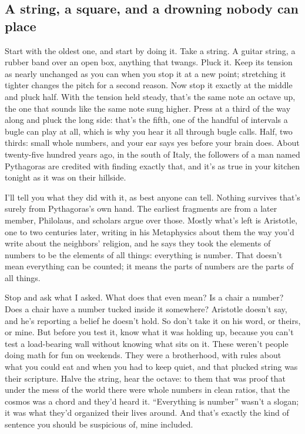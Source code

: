 \documentclass[11pt,twoside]{article}
\theoremstyle{thielethm}
\theoremstyle{thieledef}
\theoremstyle{thieledef}
\theoremstyle{thieledef}
\theoremstyle{thielethm}
\theoremstyle{thieleobs}
\theoremstyle{thielethm}
\begin{document}
\subsection{A string, a square, and a drowning nobody can place}

Start with the oldest one, and start by doing it. Take a string. A guitar string, a rubber band over an open box, anything that twangs. Pluck it. Keep its tension as nearly unchanged as you can when you stop it at a new point; stretching it tighter changes the pitch for a second reason. Now stop it exactly at the middle and pluck half. With the tension held steady, that's the same note an octave up, the one that sounds like the same note sung higher. Press at a third of the way along and pluck the long side: that's the fifth, one of the handful of intervals a bugle can play at all, which is why you hear it all through bugle calls. Half, two thirds: small whole numbers, and your ear says yes before your brain does. About twenty-five hundred years ago, in the south of Italy, the followers of a man named Pythagoras are credited with finding exactly that, and it's as true in your kitchen tonight as it was on their hillside.

I'll tell you what they did with it, as best anyone can tell. Nothing survives that's surely from Pythagoras's own hand. The earliest fragments are from a later member, Philolaus, and scholars argue over those. Mostly what's left is Aristotle, one to two centuries later, writing in his Metaphysics about them the way you'd write about the neighbors' religion, and he says they took the elements of numbers to be the elements of all things: everything is number. That doesn't mean everything can be counted; it means the parts of numbers are the parts of all things.

Stop and ask what I asked. What does that even mean? Is a chair a number? Does a chair have a number tucked inside it somewhere? Aristotle doesn't say, and he's reporting a belief he doesn't hold. So don't take it on his word, or theirs, or mine. But before you test it, know what it was holding up, because you can't test a load-bearing wall without knowing what sits on it. These weren't people doing math for fun on weekends. They were a brotherhood, with rules about what you could eat and when you had to keep quiet, and that plucked string was their scripture. Halve the string, hear the octave: to them that was proof that under the mess of the world there were whole numbers in clean ratios, that the cosmos was a chord and they'd heard it. ``Everything is number'' wasn't a slogan; it was what they'd organized their lives around. And that's exactly the kind of sentence you should be suspicious of, mine included.
\end{document}

